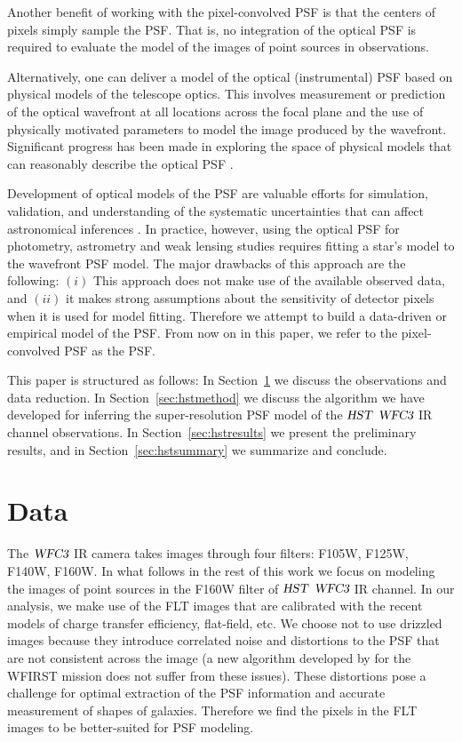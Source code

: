 \documentclass[onecolumn]{aastex61}
\newcommand{\project}[1]{{\textsl{#1}}}
\newcommand{\hst}{\project{HST}}
\newcommand{\wfc}{\project{WFC3}}
\begin{document}
Another benefit of working with the pixel-convolved PSF is that the centers of pixels simply sample the PSF. That is, no integration of the 
optical PSF is required to evaluate the model of the images of point sources in observations.

Alternatively, one can deliver a model of the optical (instrumental) PSF based on physical models of the telescope optics. 
This involves measurement or prediction of the optical wavefront at all locations across the focal plane and the use of physically motivated parameters 
to model the image produced by the wavefront. Significant progress has been made in exploring the space of physical models that can reasonably 
describe the optical PSF \citep{zernike,krist1995,krist2011,galsim_software}. 

Development of optical models of the PSF are valuable efforts for simulation, validation, and understanding of the systematic uncertainties 
that can affect astronomical inferences \citep{great3,galsim}. In practice, however, using the optical PSF for photometry, astrometry and weak lensing studies 
requires fitting a star's model to the wavefront PSF model. The major drawbacks of this approach are the following: $(i)$ This approach does not make use of the available observed 
data, and $(ii)$ it makes strong assumptions about the sensitivity of detector pixels when it is used for model fitting. Therefore we attempt to build a 
data-driven or empirical model of the PSF. From now on in this paper, we refer to the pixel-convolved PSF as the PSF. 

This paper is structured as follows: In Section~\ref{sec:hstdata} we discuss the observations and data reduction. In Section~\ref{sec:hstmethod} we discuss the algorithm we 
have developed for inferring the super-resolution PSF model of the $\hst$ $\wfc$ IR channel observations. In Section~\ref{sec:hstresults} we present the preliminary results, and %
in Section~\ref{sec:hstsummary} we summarize and conclude.

\section{Data}\label{sec:hstdata}
The $\wfc$ IR camera takes images through four filters: F105W, F125W, F140W, F160W.
In what follows in the rest of this work we focus on modeling the images of point sources in the F160W filter of $\hst$ $\wfc$ IR channel. 
In our analysis, we make use of the FLT images that are calibrated with the recent models of charge transfer efficiency, flat-field, etc. 
We choose not to use drizzled images \citep{drizzle,astrodrizzle} because they introduce correlated noise and 
distortions to the PSF that are not consistent across the image (a new algorithm developed by \citealt{olic} for the WFIRST mission does not suffer from these issues). 
These distortions pose a challenge for optimal extraction of the PSF information and accurate measurement of shapes of galaxies. Therefore we find the pixels in the FLT images to be better-suited for PSF modeling. 
\end{document}
